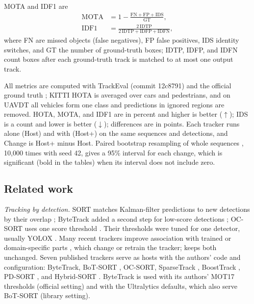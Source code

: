MOTA \cite{bernardin2008clear} and IDF1 \cite{ristani2016idf1} are
\begin{align}
\mathrm{MOTA}&=1-\frac{\mathrm{FN}+\mathrm{FP}+\mathrm{IDS}}{\mathrm{GT}},\label{eq:mota}\\
\mathrm{IDF1}&=\frac{2\,\mathrm{IDTP}}{2\,\mathrm{IDTP}+\mathrm{IDFP}+\mathrm{IDFN}},\label{eq:idf1}
\end{align}
where FN are missed objects (false negatives), FP false positives, IDS identity switches, and GT the
number of ground-truth boxes; IDTP, IDFP, and IDFN count boxes after each ground-truth track is
matched to at most one output track.

All metrics are computed with TrackEval (commit 12c8791) and the official ground truth
\cite{dendorfer2021motchallenge}; KITTI HOTA is averaged over cars and pedestrians, and on UAVDT all
vehicles form one class and predictions in ignored regions are removed. HOTA, MOTA, and IDF1 are in
percent and higher is better ($\uparrow$); IDS is a count and lower is better ($\downarrow$);
differences are in points. Each tracker runs alone (Host) and with \scl{} (Host+\scl{}) on the same
sequences and detections, and Change is Host+\scl{} minus Host. Paired bootstrap resampling of whole
sequences \cite{efron2016casi}, 10,000 times with seed 42, gives a 95\% interval for each
change, which is significant (bold in the tables) when its interval does not include zero.

\subsection{Related work}\label{sec:survey}
\emph{Tracking by detection.}\label{sec:hosts} SORT matches Kalman-filter predictions to new
detections by their overlap \cite{bewley2016sort}; ByteTrack added a second step for low-score
detections \cite{zhang2022bytetrack}; OC-SORT uses one score threshold \cite{cao2023ocsort}. Their
thresholds were tuned for one detector, usually YOLOX \cite{ge2021yolox}. Many recent trackers improve
association with trained or domain-specific parts
\cite{li2024fdbtrack,bao2024graphmatching,zhang2025sinkhorn,ding2025remot,liang2024motiontrack,sun2026bsr},
which change or retrain the tracker; \scl{} keeps both unchanged. Seven published trackers serve as
hosts with the authors' code and configuration: ByteTrack, BoT-SORT \cite{aharon2022botsort},
OC-SORT, SparseTrack \cite{liu2025sparsetrack}, BoostTrack \cite{stanojevic2024boosttrack}, PD-SORT
\cite{wang2025pdsort}, and Hybrid-SORT \cite{yang2024hybridsort}. ByteTrack is used with its authors'
MOT17 thresholds (official setting) and with the Ultralytics defaults, which also serve BoT-SORT
(library setting).

